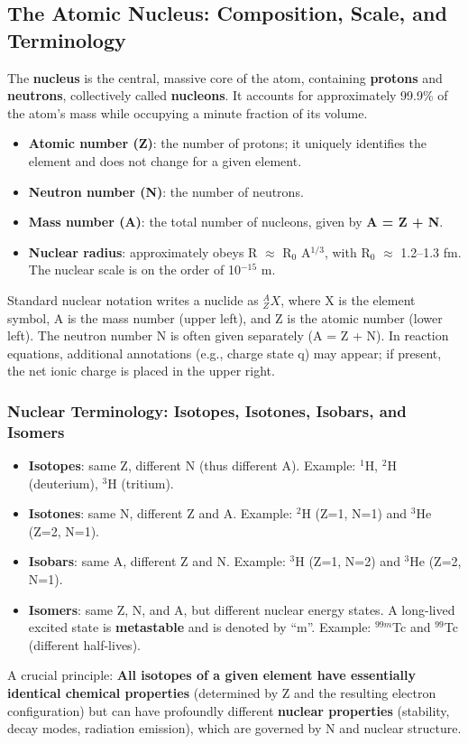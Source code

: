 \documentclass[11pt,a4paper]{article}
\let\originalsubsection\subsection
\renewcommand{\subsection}{\Needspace{8\baselineskip}\originalsubsection}
\begin{document}
\subsection{The Atomic Nucleus: Composition, Scale, and Terminology}
The \textbf{nucleus} is the central, massive core of the atom, containing \textbf{protons} and \textbf{neutrons}, collectively called \textbf{nucleons}. It accounts for approximately 99.9\% of the atom's mass while occupying a minute fraction of its volume.

\begin{itemize}
\item \textbf{Atomic number (Z)}: the number of protons; it uniquely identifies the element and does not change for a given element.
\item \textbf{Neutron number (N)}: the number of neutrons.
\item \textbf{Mass number (A)}: the total number of nucleons, given by \textbf{A = Z + N}.
\item \textbf{Nuclear radius}: approximately obeys R \ensuremath{\approx} R\ensuremath{{}_{0}} A\ensuremath{{}^{1/3}}, with R\ensuremath{{}_{0}} \ensuremath{\approx} 1.2--1.3 fm. The nuclear scale is on the order of 10\ensuremath{{}^{-15}} m.
\end{itemize}
Standard nuclear notation writes a nuclide as \({}^{A}_{Z}X\), where X is the element symbol, A is the mass number (upper left), and Z is the atomic number (lower left). The neutron number N is often given separately (A = Z + N). In reaction equations, additional annotations (e.g., charge state q) may appear; if present, the net ionic charge is placed in the upper right.

\subsubsection{Nuclear Terminology: Isotopes, Isotones, Isobars, and Isomers}
\begin{itemize}
\item \textbf{Isotopes}: same Z, different N (thus different A). Example: \ensuremath{{}^{1}}H, \ensuremath{{}^{2}}H (deuterium), \ensuremath{{}^{3}}H (tritium).
\item \textbf{Isotones}: same N, different Z and A. Example: \ensuremath{{}^{2}}H (Z=1, N=1) and \ensuremath{{}^{3}}He (Z=2, N=1).
\item \textbf{Isobars}: same A, different Z and N. Example: \ensuremath{{}^{3}}H (Z=1, N=2) and \ensuremath{{}^{3}}He (Z=2, N=1).
\item \textbf{Isomers}: same Z, N, and A, but different nuclear energy states. A long-lived excited state is \textbf{metastable} and is denoted by ``m''. Example: \ensuremath{{}^{99m}}Tc and \ensuremath{{}^{99}}Tc (different half-lives).
\end{itemize}
A crucial principle: \textbf{All isotopes of a given element have essentially identical chemical properties} (determined by Z and the resulting electron configuration) but can have profoundly different \textbf{nuclear properties} (stability, decay modes, radiation emission), which are governed by N and nuclear structure.
\end{document}
